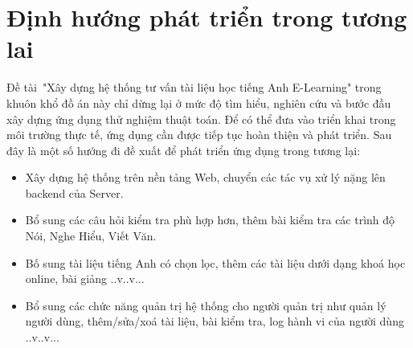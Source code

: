\section{Định hướng phát triển trong tương lai}
Đề tài "Xây dựng hệ thống tư vấn tài liệu học tiếng Anh E-Learning" trong khuôn khổ đồ án này chỉ dừng lại ở mức độ tìm hiểu, nghiên cứu và bước đầu xây dựng ứng dụng thử nghiệm thuật toán. Để có thể đưa vào triển khai trong môi trường thực tế, ứng dụng cần được tiếp tục hoàn thiện và phát triển. Sau đây là một số hướng đi đề xuất để phát triển ứng dụng trong tương lại:
\begin{itemize}
	\item Xây dựng hệ thống trên nền tảng Web, chuyển các tác vụ xử lý nặng lên backend của Server.
	\item Bổ sung các câu hỏi kiểm tra phù hợp hơn, thêm bài kiểm tra các trình độ Nói, Nghe Hiểu, Viết Văn. 
	\item Bố sung tài liệu tiếng Anh có chọn lọc, thêm các tài liệu dưới dạng khoá học online, bài giảng ..v..v...
	\item Bổ sung các chức năng quản trị hệ thống cho người quản trị như quản lý người dùng, thêm/sửa/xoá tài liệu, bài kiểm tra, log hành vi của người dùng ..v..v... 
\end{itemize}
